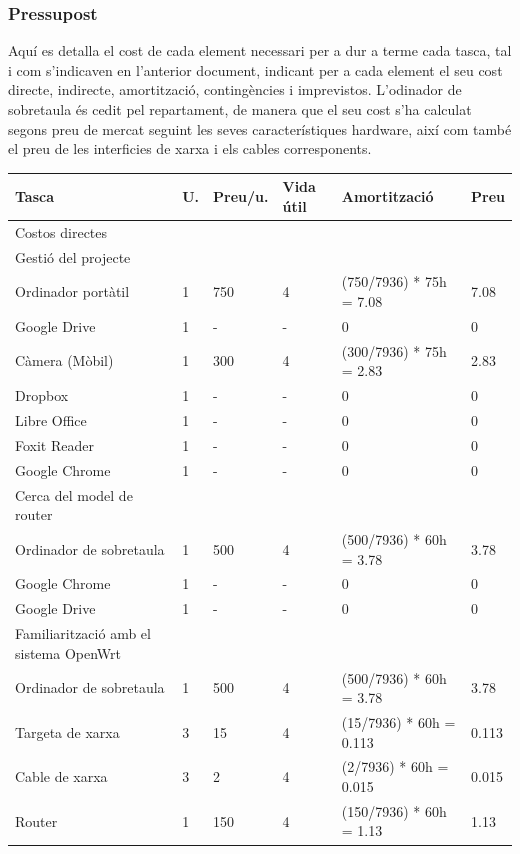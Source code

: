 \documentclass[11pt]{article}
\begin{document}
\subsubsection{Pressupost}
Aquí es detalla el cost de cada element necessari per a dur a terme cada tasca, tal i com s’indicaven en l’anterior document, indicant per a cada element el seu cost directe, indirecte, amortització, contingències i imprevistos. L’odinador de sobretaula és cedit pel repartament, de manera que el seu cost s’ha calculat segons preu de mercat seguint les seves característiques hardware, així com també el preu de les interficies de xarxa i els cables corresponents.
\begin{center}
	\begin{tabular}{| l | l | l | l | l | l |}
		\hline
		Tasca & U. & Preu/u. & Vida útil & Amortització & Preu \\ \hline
		Costos directes & & & & & \\ \hline
		Gestió del projecte & & & & & \\ \hline
		Ordinador portàtil & 1 & 750 & 4 & (750/7936) * 75h = 7.08 & 7.08 \\ \hline
		Google Drive & 1 & - & - & 0 & 0 \\ \hline
		Càmera (Mòbil) & 1 & 300 & 4 & (300/7936) * 75h = 2.83 & 2.83 \\ \hline
		Dropbox & 1 & - & - & 0 & 0 \\ \hline
		Libre Office & 1 & - & - & 0 & 0 \\ \hline
		Foxit Reader & 1 & - & - & 0 & 0 \\ \hline
		Google Chrome & 1 & - & - & 0 & 0 \\ \hline
		Cerca del model de router & & & & & \\ \hline
		Ordinador de sobretaula & 1 & 500 & 4 & (500/7936) * 60h = 3.78 & 3.78 \\ \hline
		Google Chrome & 1 & - & - & 0 & 0 \\ \hline
		Google Drive & 1 & - & - & 0 & 0 \\ \hline
		Familiarització amb el sistema OpenWrt & & & & & \\ \hline
		Ordinador de sobretaula & 1 & 500 & 4 & (500/7936) * 60h = 3.78 & 3.78 \\ \hline
		Targeta de xarxa & 3 & 15 & 4 & (15/7936) * 60h = 0.113 & 0.113 \\ \hline
		Cable de xarxa & 3 & 2 & 4 & (2/7936) * 60h = 0.015 & 0.015 \\ \hline
		Router & 1 & 150 & 4 & (150/7936) * 60h = 1.13 & 1.13 \\ \hline

\end{tabular}
\end{center}
\end{document}
